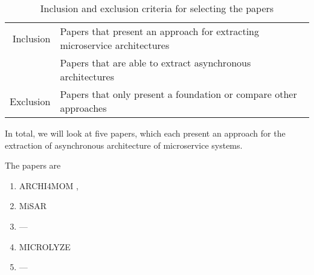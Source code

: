 \begin{table}
\centering
\begin{tabular}{r l}
\toprule
Inclusion
& Papers that present an approach for extracting microservice architectures \\
& Papers that are able to extract asynchronous architectures \\
\midrule
Exclusion
& Papers that only present a foundation or compare other approaches \\
\bottomrule
\end{tabular}
\caption{Inclusion and exclusion criteria for selecting the papers}
\label{table:InclusionExclusion}
\end{table}



In total, we will look at five papers, which each present an approach for the extraction of asynchronous architecture of microservice systems.


The papers are
\begin{enumerate}
	\item ARCHI4MOM \cite{Singh2022ARCHI4MOM}, \cite{Singh2021}
	\item MiSAR \cite{Alshuqayran2018MiSAR}
	\item --- \cite{Brosig2011}
	\item MICROLYZE \cite{Kleehaus2018} %
	\item --- \cite{Mayer2018} %
\end{enumerate}